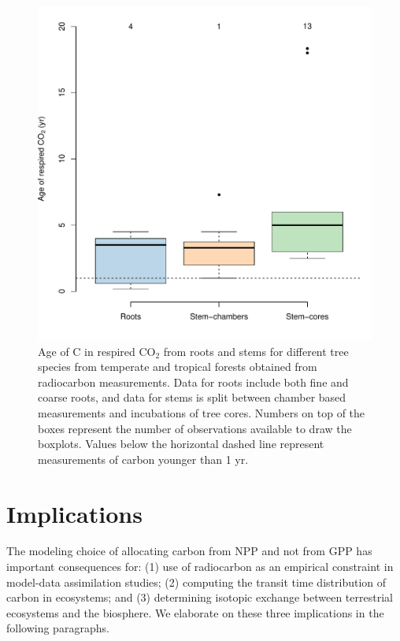 \documentclass[12pt, a4paper]{article}
\begin{document}
\begin{figure}[htbp]
   \centering
   \includegraphics[scale=0.8]{ageRespiredC.pdf} %
   \caption{Age of C in respired CO$_2$ from roots and stems for different tree species from temperate and tropical forests obtained from radiocarbon measurements. Data for roots include both fine and coarse roots, and data for stems is split between chamber based measurements and incubations of tree cores. Numbers on top of the boxes represent the number of observations available to draw the boxplots. Values below the horizontal dashed line represent measurements of carbon younger than 1 yr.} %
   \label{fig:ageRespiredC}
\end{figure}


\section{Implications}
The modeling choice of allocating carbon from NPP and not from GPP has important consequences for: (1) use of radiocarbon as an empirical constraint in model-data assimilation studies; (2) computing the transit time distribution of carbon in ecosystems; and (3) determining isotopic exchange between terrestrial ecosystems and the biosphere. We elaborate on these three implications in the following paragraphs. 
\end{document}
